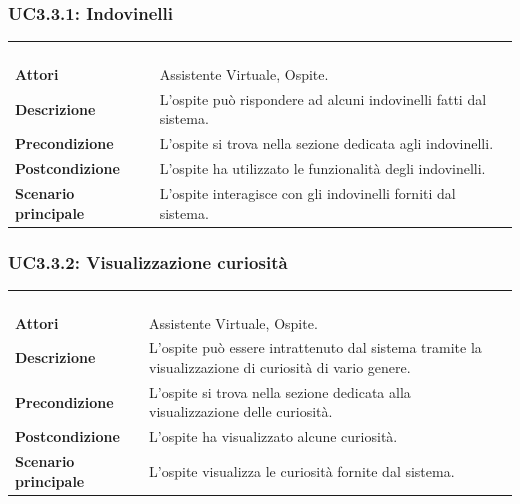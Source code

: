 \subsubsection{UC3.3.1: Indovinelli}
\label{UC3.3.1}
\begin{longtable}{l|p{10cm}}
	\rowcolor[gray]{0.8} \multicolumn{2}{c}{} \\
	\rowcolor[gray]{0.8} \multicolumn{2}{c}{\textbf{UC3.3.1 - Indovinelli}} \\
	\rowcolor[gray]{0.8} \multicolumn{2}{c}{} \\
	\hline
	&\\
	\textbf{Attori} & Assistente Virtuale, Ospite.\\[7pt]
	\textbf{Descrizione} & L'ospite può rispondere ad alcuni indovinelli fatti dal sistema.\\[7pt]
	\textbf{Precondizione} & L'ospite si trova nella sezione dedicata agli indovinelli.\\[7pt]
	\textbf{Postcondizione} & L'ospite ha utilizzato le funzionalità degli indovinelli.\\[7pt]
	\textbf{Scenario principale} &L'ospite interagisce con gli indovinelli forniti dal sistema.\\[7pt]\hline
\end{longtable}

\subsubsection{UC3.3.2: Visualizzazione curiosità}
\label{UC3.3.2}
\begin{longtable}{l|p{10cm}}
	\rowcolor[gray]{0.8} \multicolumn{2}{c}{} \\
	\rowcolor[gray]{0.8} \multicolumn{2}{c}{\textbf{UC3.3.2 - Visualizzazione curiosità}} \\
	\rowcolor[gray]{0.8} \multicolumn{2}{c}{} \\
	\hline
	&\\
	\textbf{Attori} & Assistente Virtuale, Ospite.\\[7pt]
	\textbf{Descrizione} & L'ospite può essere intrattenuto dal sistema tramite la visualizzazione di curiosità di vario genere.\\[7pt]
	\textbf{Precondizione} & L'ospite si trova nella sezione dedicata alla visualizzazione delle curiosità.\\[7pt]
	\textbf{Postcondizione} & L'ospite ha visualizzato alcune curiosità.\\[7pt]
	\textbf{Scenario principale} &L'ospite visualizza le curiosità fornite dal sistema.\\[7pt]\hline
\end{longtable}

